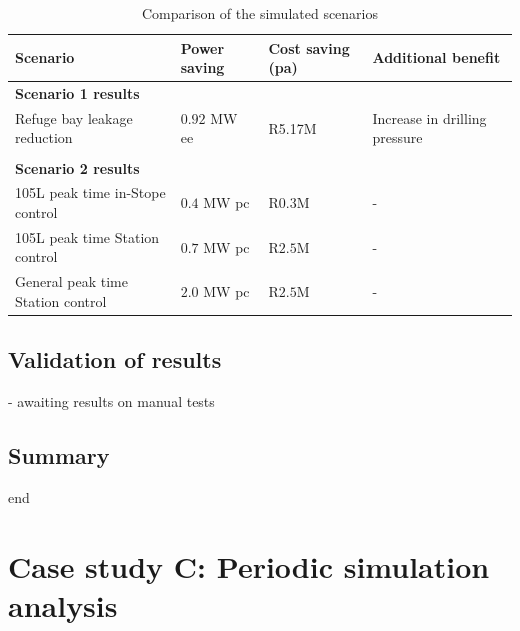 	\begin{table}[h]
		\centering
		\begin{tabular}{p{}
				p{}
				p{}
				p{}}
			\hline 
			 \vspace{0.5em}Scenario  &  \vspace{0.5em}Power saving &  Cost saving (\gls{pa}) &  \vspace{0.5em}Additional benefit  \\
			\hline
			\multicolumn{4}{l}{\textbf{Scenario 1 results}} \\
			Refuge bay leakage reduction & $ 0.92 $ MW \gls{ee}  &  R5.17M & Increase in drilling pressure \\
			 \\
			\multicolumn{4}{l}{\textbf{Scenario 2 results}}  \\
			105L peak time in-Stope control & $ 0.4 $ MW \gls{pc} & R$ 0.3 $M& - \\
			105L peak time Station control & $ 0.7 $ MW \gls{pc} & R$ 2.5 $M& - \\
			General peak time Station control & $ 2.0 $ MW \gls{pc} & R$ 2.5 $M& - \\
			\hline 
		\end{tabular}
		\caption{Comparison of the simulated scenarios}
		\label{Table: B Comparison}
	\end{table}

	\subsection{Validation of results}
	
	- awaiting results on manual tests
	
	\subsection{Summary}
	end
\clearpage

\section{Case study C: Periodic simulation analysis}
